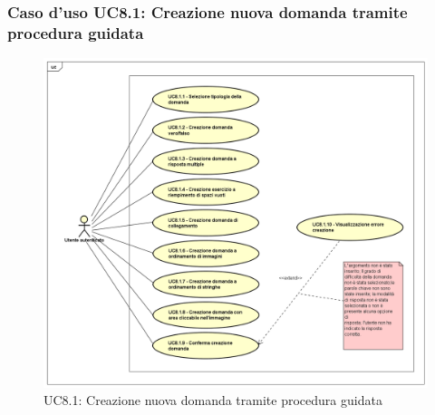 	\subsubsection{Caso d'uso UC8.1: Creazione nuova domanda tramite procedura guidata}
	\label{UC8.1}
	\begin{figure}[h]
		\centering
			\includegraphics[scale=0.45,keepaspectratio]{UML/UC8_1.png}
		\caption{UC8.1: Creazione nuova domanda tramite procedura guidata}
	\end{figure}
	\FloatBarrier
